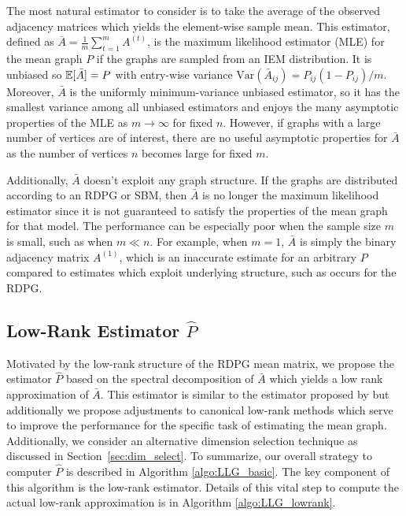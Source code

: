 The most natural estimator to consider is to take the average of the observed adjacency matrices which yields the element-wise sample mean.
This estimator, defined as $\bar{A}=\frac{1}{m}\sum_{t=1}^m A^{(t)}$, is the  maximum likelihood estimator (MLE) for the mean graph $P$ if the graphs are sampled from an IEM distribution.
It is unbiased so $\mathbb{E}[\bar{A}]=P$ with entry-wise variance $\mathrm{Var}(\bar{A}_{ij}) = P_{ij} (1-P_{ij})/m$. Moreover, $\bar{A}$ is the uniformly minimum-variance unbiased estimator, so it has the smallest variance among all unbiased estimators and enjoys the many asymptotic properties of the MLE as $m\to \infty$ for fixed $n$.
However, if graphs with a large number of vertices are of interest, there are no useful asymptotic properties for $\bar{A}$ as the number of vertices $n$ becomes large for fixed $m$.

Additionally, $\bar{A}$ doesn't exploit any graph structure.
If the graphs are distributed according to an RDPG or SBM, then $\bar{A}$ is no longer the maximum likelihood estimator since it is not guaranteed to satisfy the properties of the mean graph for that model.
The performance can be especially poor when the sample size $m$ is small, such as when $m \ll n$.
For example, when $m = 1$, $\bar{A}$ is simply the binary adjacency matrix $A^{(1)}$, which is an inaccurate estimate for an arbitrary $P$ compared to estimates which exploit underlying structure, such as occurs for the RDPG.



\subsection[Low-Rank Estimator]{Low-Rank Estimator $\hat{P}$}
\label{sec:LLG_phat}

Motivated by the low-rank structure of the RDPG mean matrix, we propose the estimator $\hat{P}$ based on the spectral decomposition of $\bar{A}$ which yields a low rank approximation of $\bar{A}$.
This estimator is similar to the estimator proposed by \citet{chatterjee2015matrix} but additionally
we propose adjustments to canonical low-rank methods which serve to improve the performance for the specific task of estimating the mean graph. 
Additionally, we consider an alternative dimension selection technique as discussed in Section~\ref{sec:dim_select}.
To summarize, our overall strategy to computer $\hat{P}$ is described in Algorithm \ref{algo:LLG_basic}. The key component of this algorithm is the low-rank estimator. Details of this vital step to compute the actual low-rank approximation is in Algorithm \ref{algo:LLG_lowrank}.

